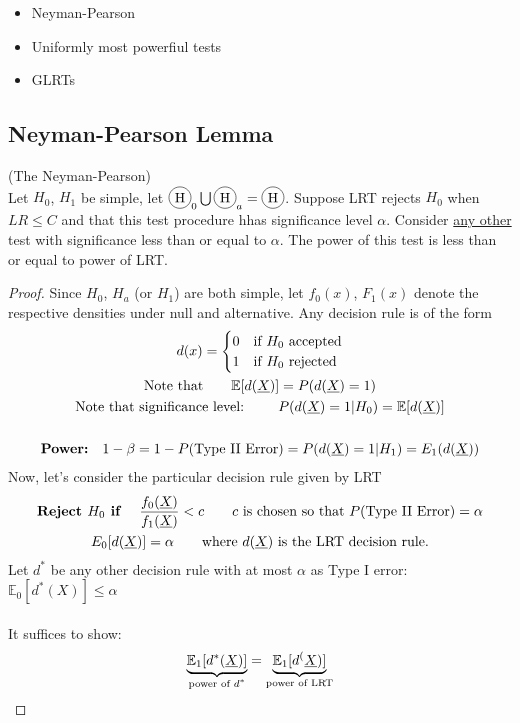 \begin{itemize}
	\item Neyman-Pearson
	\item Uniformly most powerfiul tests
	\item GLRTs
\end{itemize}
\subsection*{Neyman-Pearson Lemma}
\begin{theorem} (The Neyman-Pearson)\\
Let $H_0$, $H_1$ be simple, let $\circled{H}_0 \bigcup \circled{H}_a = \circled{H}$. Suppose LRT rejects $H_0$ when $LR \leq C$ and that this test procedure hhas significance level $\alpha$. Consider \underline{any other} test with significance less than or equal to $\alpha$. The power of this test is less than or equal to power of LRT.
\end{theorem}
\begin{proof}
	Since $H_0$, $H_a$ (or $H_1$) are both simple, let $f_0(x)$, $F_1(x)$ denote the respective densities under null and alternative. 	Any decision rule is of the form 
	\begin{gather*}
		d(x) = \begin{cases}
		0 & \text{if $H_0$ accepted}\\
		1 & \text{if $H_0$ rejected}
		\end{cases}\\
		\text{Note that} \qquad \mathbb{E}[d(\underline{X})] = P(d(\underline{X}) = 1)\\
		\text{Note that significance level: } \qquad P(d(\underline{X}) = 1 | H_0) = \mathbb{E}[d(\underline{X})]\\\\
		\textbf{Power:} \quad 1 - \beta = 1 - P(\text{Type II Error}) = P(d(\underline{X}) = 1 | H_1) = E_1 (d(\underline{X}))
	\end{gather*}
	Now, let's consider the particular decision rule given by LRT
	\begin{gather*}
		\textbf{Reject $H_0$ if }\quad \frac{f_0(\underline{X})}{f_1(\underline{X})} < c \qquad c \text{ is chosen so that } P(\text{Type II Error}) = \alpha\\
		E_0[d(\underline{X})] = \alpha \qquad \text{where $d(\underline{X})$ is the LRT decision rule}.
	\end{gather*}
	Let $d^*$ be any other decision rule with at most $\alpha$ as Type I error: $\mathbb{E}_0 [d^*(X)] \leq \alpha$\\\\
	It suffices to show:
	\begin{equation*}
		\underbrace{\mathbb{E}_1 [d^*(\underline{X})]}_{\text{power of $d^*$}} = \underbrace{\mathbb{E}_1 [d^(\underline{X})]}_{\text{power of LRT}}
	\end{equation*} 
\end{proof}
